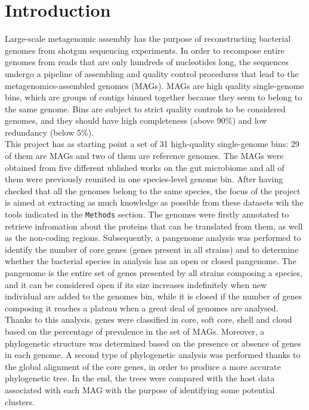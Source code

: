\section*{Introduction}

Large-scale metagenomic assembly has the purpose of reconstructing bacterial genomes from shotgun sequencing experiments. In order to recompose entire genomes from reads that are only hundreds of nucleotides long, the sequences undergo a pipeline of assembling and quality control procedures that lead to the metagenomics-assembled genomes (MAGs). MAGs are high quality single-genome bins, which are groups of contigs binned together because they seem to belong to the same genome. Bins are subject to strict quality controls to be considered genomes, and they should have high completeness (above 90\%) and low redundancy (below 5\%).\\

This project has as starting point a set of 31 high-quality single-genome bins: 29 of them are MAGs and two of them are reference genomes. The MAGs were obtained from five different ublished works on the gut microbiome \cite{origin1,origin2,origin3,origin4,origin5} and all of them were previously reunited in one species-level genome bin. After having checked that all the genomes belong to the same species, the focus of the project is aimed at extracting as much knowledge as possible from these datasets wih the tools indicated in the \texttt{Methods} section. The genomes were firstly annotated to retrieve infromation about the proteins that can be translated from them, as well as the non-coding regions. Subsequently, a pangenome analysis was performed to identify the number of core genes (genes present in all strains) and to determine whether the bacterial species in analysis has an open or closed pangenome. The pangenome is the entire set of genes presented by all strains composing a species, and it can be considered open if its size increases indefinitely when new individual are added to the genomes bin, while it is closed if the number of genes composing it reaches a plateau when a great deal of genomes are analysed. Thanks to this analysis, genes were classified in core, soft core, shell and cloud based on the percentage of prevalence in the set of MAGs. Moreover, a phylogenetic structure was determined based on the presence or absence of genes in each genome. A second type of phylogenetic analysis was performed thanks to the global alignment of the core genes, in order to produce a more accurate phylogenetic tree. In the end, the trees were compared with the host data associated with each MAG with the purpose of identifying some potential clusters. 